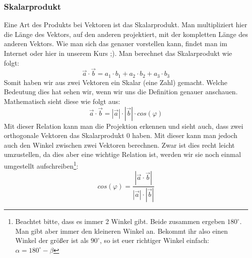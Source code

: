 	\subsubsection{Skalarprodukt}
		Eine Art des Produkts bei Vektoren ist das Skalarprodukt. Man multipliziert
		hier die Länge des Vektors, auf den anderen projektiert, mit der kompletten
		Länge des anderen Vektors. Wie man sich das genauer vorstellen kann, findet
		man im Internet oder hier in unserem Kurs ;). Man berechnet das Skalarprodukt
		wie folgt:
		\[\vec{a}\cdot \vec{b}=a_1\cdot b_1+a_2\cdot b_2+a_3\cdot b_3\]
		Somit haben wir aus zwei Vektoren ein Skalar (eine Zahl) gemacht. Welche
		Bedeutung dies hat sehen wir, wenn wir uns die Definition genauer anschauen.
		Mathematisch sieht diese wie folgt aus:
		\[\vec{a}\cdot \vec{b}=|\vec{a}|\cdot |\vec{b}|\cdot cos(\varphi)\]
		Mit dieser Relation kann man die Projektion erkennen und sieht auch, dass zwei
		orthogonale Vektoren das Skalarprodukt 0 haben. Mit dieser kann man jedoch
		auch den Winkel zwischen zwei Vektoren berechnen. Zwar ist dies recht leicht
		umzustellen, da dies aber eine wichtige Relation ist, werden wir sie noch
		einmal umgestellt aufschreiben\footnote{Beachtet bitte, dass es immer 2 Winkel
		gibt. Beide zusammen ergeben \(180^{\circ}\). Man gibt aber immer den
		kleineren Winkel an. Bekommt ihr also einen Winkel der größer ist als
		\(90^{\circ}\), so ist euer richtiger Winkel einfach:
		\(\alpha=180^{\circ}-\beta\)}:
		\[cos(\varphi)=\frac{ | \vec{a}\cdot \vec{b} | }{|\vec{a}|\cdot |\vec{b}|}\]

